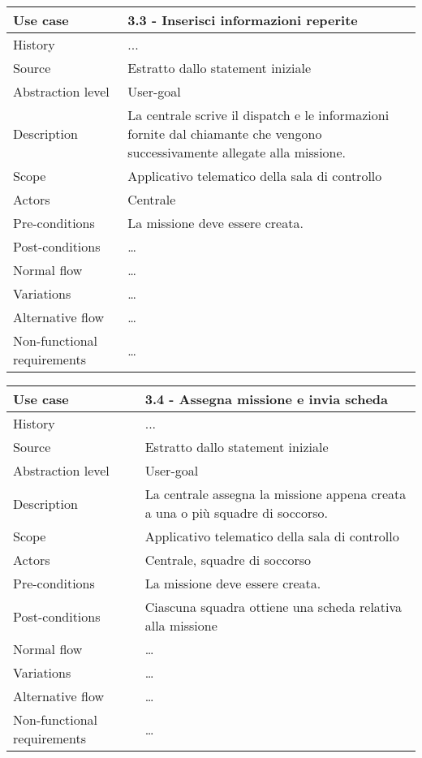 \documentclass{article}
\begin{document}
    \begin{table}
        \begin{tabularx}{\textwidth}{l|X}
            Use case & 3.3 - Inserisci informazioni reperite \\
            \hline
            History & ...                                     \\
            Source & Estratto dallo statement iniziale \\
            Abstraction level & User-goal \\
            Description & La centrale scrive il dispatch e le informazioni fornite dal chiamante che vengono successivamente allegate alla missione. \\
            Scope & Applicativo telematico della sala di controllo \\
            Actors & Centrale \\
            Pre-conditions & La missione deve essere creata. \\
            Post-conditions & \dots \\
            Normal flow & \dots \\
            Variations & \dots \\
            Alternative flow & \dots \\
            Non-functional requirements & \dots
        \end{tabularx}
        \label{tab:usecase3.3}
    \end{table}

    \begin{table}
        \begin{tabularx}{\textwidth}{l|X}
            Use case & 3.4 - Assegna missione e invia scheda \\
            \hline
            History & ...                                     \\
            Source & Estratto dallo statement iniziale \\
            Abstraction level & User-goal \\
            Description & La centrale assegna la missione appena creata a una o più squadre di soccorso. \\
            Scope & Applicativo telematico della sala di controllo \\
            Actors & Centrale, squadre di soccorso \\
            Pre-conditions & La missione deve essere creata. \\
            Post-conditions & Ciascuna squadra ottiene una scheda relativa alla missione \\
            Normal flow & \dots \\
            Variations & \dots \\
            Alternative flow & \dots \\
            Non-functional requirements & \dots
        \end{tabularx}
        \label{tab:usecase3.4}
    \end{table}
\end{document}
